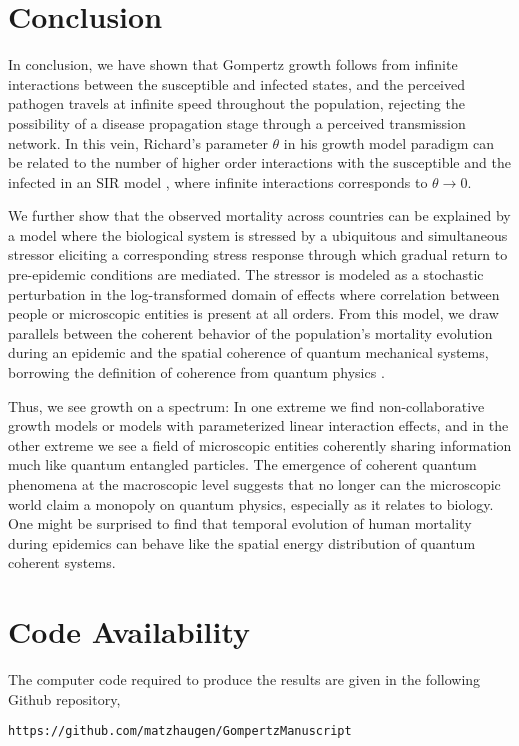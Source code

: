 \documentclass{article}
\begin{document}
\section{Conclusion}
In conclusion, we have shown that Gompertz growth follows from infinite interactions between the susceptible and infected states, and the perceived pathogen travels at infinite speed throughout the population, rejecting the possibility of a disease propagation stage through a perceived transmission network. In this vein, Richard's parameter $\theta$ in his growth model paradigm can be related to the number of higher order interactions with the susceptible and the infected in an SIR model \citep{richards1959flexible}, where infinite interactions corresponds to $\theta\rightarrow 0$. 

We further show that the observed mortality across countries can be explained by a model where the biological system is stressed by a ubiquitous and simultaneous stressor eliciting a corresponding stress response through which gradual return to pre-epidemic conditions are mediated. The stressor is modeled as a stochastic perturbation in the log-transformed domain of effects where correlation between people or microscopic entities is present at all orders. From this model, we draw parallels between the coherent behavior of the population's mortality evolution during an epidemic and the spatial coherence of quantum mechanical systems, borrowing the definition of coherence from quantum physics \citep{molski2003coherent}.

Thus, we see growth on a spectrum: In one extreme we find non-collaborative growth models or models with parameterized linear interaction effects, and in the other extreme we see a field of microscopic entities coherently sharing information much like quantum entangled particles. The emergence of coherent quantum phenomena at the macroscopic level suggests that no longer can the microscopic world claim a monopoly on quantum physics, especially as it relates to biology. One might be surprised to find that temporal evolution of human mortality during epidemics can behave like the spatial energy distribution of quantum coherent systems.

\section*{Code Availability}
The computer code required to produce the results are given in the following Github repository,
\begin{verbatim}
https://github.com/matzhaugen/GompertzManuscript
\end{verbatim}
\end{document}
